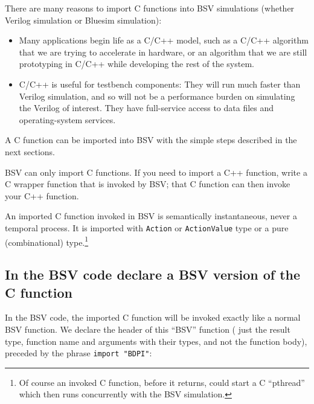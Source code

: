 \vspace{1ex}

There are many reasons to import C functions into BSV simulations
(whether Verilog simulation or Bluesim simulation):

\begin{itemize}

 \item Many applications begin life as a C/C++ model, such as a C/C++
       algorithm that we are trying to accelerate in hardware, or an
       algorithm that we are still prototyping in C/C++ while
       developing the rest of the system.

 \item C/C++ is useful for testbench components: They will run much
       faster than Verilog simulation, and so will not be a
       performance burden on simulating the Verilog of interest.  They
       have full-service access to data files and operating-system
       services.

\end{itemize}

A C function can be imported into BSV with the simple steps described
in the next sections.

BSV can only import C functions.  If you need to import a C++
function, write a C wrapper function that is invoked by BSV; that C
function can then invoke your C++ function.

An imported C function invoked in BSV is semantically instantaneous,
never a temporal process.  It is imported with \verb|Action| or
\verb|ActionValue| type or a pure (combinational) type.\footnote{Of
course an invoked C function, before it returns, could start a C
``pthread'' which then runs concurrently with the BSV simulation.}


\subsection{In the BSV code declare a BSV version of the C function}


In the BSV code, the imported C function will be invoked exactly like
a normal BSV function.  We declare the header of this ``BSV'' function
({\ie} just the result type, function name and arguments with their
types, and not the function body), preceded by the phrase {\tt import
"BDPI"}:

